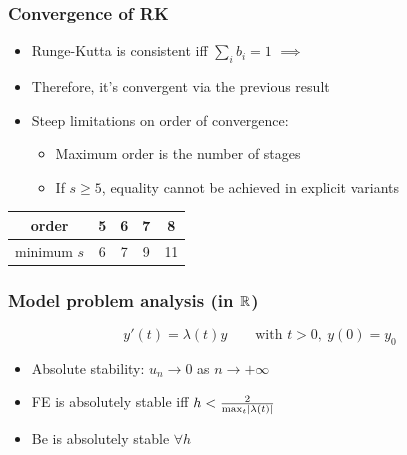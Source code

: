 \documentclass{beamer}
\begin{document}
\begin{frame} %
\frametitle{Convergence of RK}
	\begin{itemize}
		\item Runge-Kutta is consistent iff $\sum_i b_i = 1$ $\implies$
		\item Therefore, it's convergent via the previous result
		\item Steep limitations on order of convergence:
		\begin{itemize}
			\item Maximum order is the number of stages
			\item If $s \ge 5$, equality cannot be achieved in explicit variants \\[30pt]
		\end{itemize}
	\end{itemize}
	\begin{center}
		\begin{tabular}{c|cccc}
			order & 5 & 6 & 7 & 8\\
			\hline
			minimum $s$ & 6 & 7 & 9 & 11 
		\end{tabular}
	\end{center}
\end{frame}



\begin{frame} %
\frametitle{Model problem analysis (in $\mathbb R$)}
	$$ y'(t) = \lambda(t) y \qquad \text{with } t > 0, \ y(0) = y_0 $$
	\begin{itemize}
		\item Absolute stability: $u_n \to 0$ as $n \to +\infty$
		\item FE is absolutely stable iff $h < \frac{2}{\max_t \lvert\lambda(t)\rvert} $
		\item Be is absolutely stable $\forall h$
	\end{itemize}
\end{frame}
\end{document}

